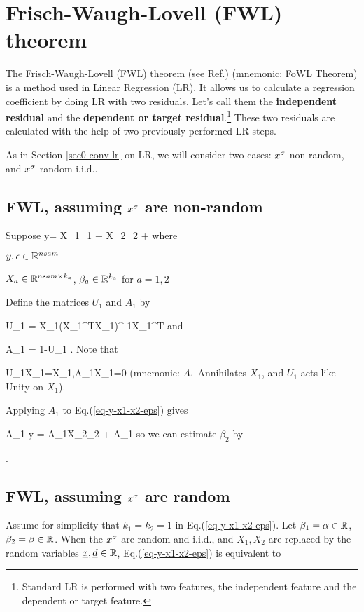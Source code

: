 \chapter{Frisch-Waugh-Lovell (FWL) theorem}
\label{ch-fwl-theo}

The Frisch-Waugh-Lovell (FWL) theorem
(see Ref.\cite{wiki-fwl-theo})
(mnemonic: FoWL Theorem)
is a method used in Linear Regression (LR).
It allows us to
calculate
a regression coefficient
by doing LR with two residuals. Let's call them
the {\bf independent residual} and the
{\bf dependent or target residual}.\footnote{Standard 
LR is performed with two features,
the independent feature and the dependent or target feature.}
These  two residuals are calculated 
with the help of two previously
performed LR steps.

As in Section \ref{sec0-conv-lr}
on LR, we will consider
two cases: $x^\sigma$ non-random, and $x^\sigma$ random i.i.d..

\section{FWL, assuming $x^\sigma$ are non-random}
Suppose
\beq
y=  X_1\beta_1 + X_2\beta_2 + \eps
\label{eq-y-x1-x2-eps}
\eeq
where

$y, \epsilon\in { \mathbb{R}}^{nsam}$

$X_a\in { \mathbb{R}}^{nsam\times k_a}$,
$\beta_a\in { \mathbb{R}}^{k_a}$ for $a=1,2$

Define the matrices $U_1$ and $A_1$ by

\beq
U_1 = X_1(X_1^TX_1)^{-1}X_1^T
\eeq
and

\beq
A_1 = 1-U_1
\;.
\eeq
Note that

\beq
U_1X_1=X_1\;,\;\;A_1X_1=0
\eeq
(mnemonic: $A_1$ Annihilates $X_1$,
and $U_1$ acts like Unity on $X_1$).

Applying $A_1$ to Eq.(\ref{eq-y-x1-x2-eps}) gives

\beq
A_1 y = A_1X_2\beta_2  + A_1\eps
\eeq
so we can estimate $\beta_2$ by

\beq
{}
\label{eq-fwl-nonrand}
\;.
\eeq
\section{FWL, assuming $x^\sigma$ are random}


Assume for simplicity that 
$k_1=k_2=1$
in Eq.(\ref{eq-y-x1-x2-eps}). Let
$\beta_1=\alpha\in{ \mathbb{R}}$, 
$\beta_2=\beta\in{ \mathbb{R}}$.
When the $x^\sigma$ are random and i.i.d.,
and
$X_1, X_2$ are
replaced by 
the random variables
${\underline{x}}, {\underline{d}}\in { \mathbb{R}}$,
Eq.(\ref{eq-y-x1-x2-eps})
is equivalent to


